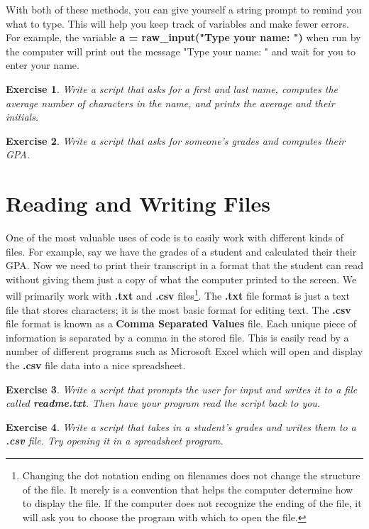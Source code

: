 \documentclass[12pt]{amsart}
\newtheorem{quest}{Exercise}
\theoremstyle{definition}
\begin{document}
With both of these methods, you can give yourself a string prompt to remind you what to type. This will help you keep track of variables and make fewer errors. For example, the variable \textbf{a = raw\_input("Type your name: ")} when run by the computer will print out the message "Type your name: " and wait for you to enter your name.

\begin{quest}
Write a script that asks for a first and last name, computes the average number of characters in the name, and prints the average and their initials.
\end{quest}
\begin{quest}
Write a script that asks for someone's grades and computes their GPA.
\end{quest}

\section{Reading and Writing Files}%

One of the most valuable uses of code is to easily work with different kinds of files. For example, say we have the grades of a student and calculated their their GPA. Now we need to print their transcript in a format that the student can read without giving them just a copy of what the computer printed to the screen. We will primarily work with \textbf{.txt} and \textbf{.csv} files\footnote{Changing the dot notation ending on filenames does not change the structure of the file. It merely is a convention that helps the computer determine how to display the file. If the computer does not recognize the ending of the file, it will ask you to choose the program with which to open the file.}. The \textbf{.txt} file format is just a text file that stores characters; it is the most basic format for editing text. The \textbf{.csv} file format is known as a \textbf{Comma Separated Values} file. Each unique piece of information is separated by a comma in the stored file. This is easily read by a number of different programs such as Microsoft Excel which will open and display the \textbf{.csv} file data into a nice spreadsheet.

\begin{quest}
Write a script that prompts the user for input and writes it to a file called \textbf{readme.txt}. Then have your program read the script back to you.
\end{quest}
\begin{quest}
Write a script that takes in a student's grades and writes them to a \textbf{.csv} file. Try opening it in a spreadsheet program.
\end{quest}
\end{document}
